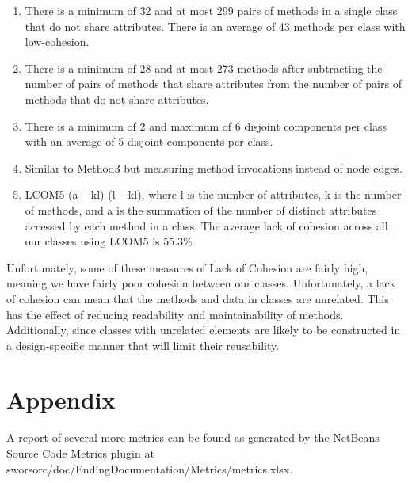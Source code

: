 \documentclass[12pt,a4paper,titlepage]{article}
\begin{document}
\begin{enumerate}
\item There is a minimum of 32 and at most 299 pairs of methods in a single class that do 
  not share attributes. There is an average of 43 methods per class with low-cohesion.
\item There is a minimum of 28 and at most 273 methods after subtracting the number of pairs of 
  methods that share attributes from the number of pairs of methods that do not share 
  attributes.
\item There is a minimum of 2 and maximum of 6 disjoint components per class with an average 
  of 5 disjoint components per class.
\item Similar to Method3 but measuring method invocations instead of node edges.
\item LCOM5 \= (a – kl) \/ (l – kl), where l is the number of attributes, k is the number of 
  methods, and a is the summation of the number of distinct attributes accessed by each 
  method in a class. The average lack of cohesion across all our classes using LCOM5 is 55.3\%
\end{enumerate}

Unfortunately, some of these measures of Lack of Cohesion are fairly high, meaning we have 
fairly poor cohesion between our classes. Unfortunately, a lack of cohesion can mean that 
the methods and data in classes are unrelated. This has the effect of reducing readability and 
maintainability of methods. Additionally, since classes with unrelated elements are likely to 
be constructed in a design-specific manner that will limit their reusability.

\section{Appendix}
A report of several more metrics can be found as generated by the NetBeans Source Code Metrics 
plugin at sworsorc/doc/EndingDocumentation/Metrics/metrics.xlsx.
\end{document}
